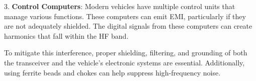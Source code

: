 3. \textbf{Control Computers}: Modern vehicles have multiple control units that manage various functions. These computers can emit EMI, particularly if they are not adequately shielded. The digital signals from these computers can create harmonics that fall within the HF band.

To mitigate this interference, proper shielding, filtering, and grounding of both the transceiver and the vehicle's electronic systems are essential. Additionally, using ferrite beads and chokes can help suppress high-frequency noise.

